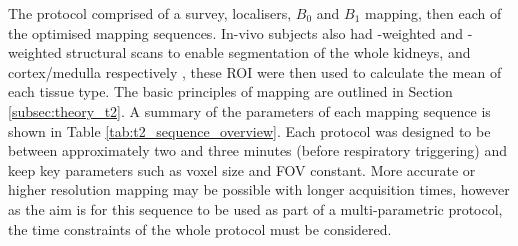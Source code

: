 The protocol comprised of a survey, localisers, $B_0$ and $B_1$ mapping, then each of the optimised \ttwo mapping sequences. In-vivo subjects also had \ttwo-weighted and \tone-weighted structural scans to enable segmentation of the whole kidneys, and cortex/medulla respectively \cite{petzold_building_2014, will_automated_2014}, these \ac{ROI} were then used to calculate the mean \ttwo of each tissue type. The basic principles of \ttwo mapping are outlined in Section \ref{subsec:theory_t2}. A summary of the parameters of each \ttwo mapping sequence is shown in Table \ref{tab:t2_sequence_overview}. Each protocol was designed to be between approximately two and three minutes (before respiratory triggering) and keep key parameters such as voxel size and \ac{FOV} constant. More accurate or higher resolution \ttwo mapping may be possible with longer acquisition times, however as the aim is for this sequence to be used as part of a multi-parametric protocol, the time constraints of the whole protocol must be considered. 


